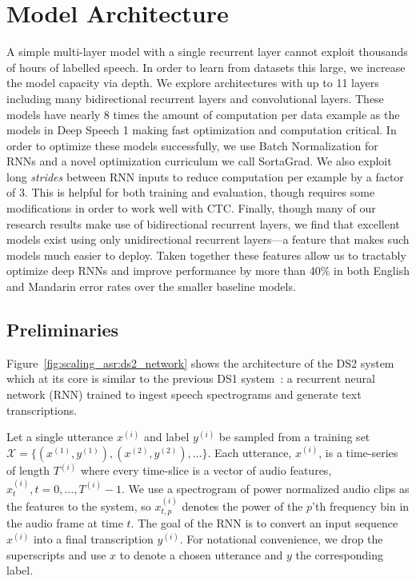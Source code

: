 \section{Model Architecture}
\label{sec:scale_asr:model}

A simple multi-layer model with a single recurrent layer cannot exploit
thousands of hours of labelled speech. In order to learn from datasets this
large, we increase the model capacity via depth. We explore architectures with
up to 11 layers including many bidirectional recurrent layers and convolutional
layers. These models have nearly 8 times the amount of computation per data
example as the models in Deep Speech 1 making fast optimization and computation
critical. In order to optimize these models successfully, we use Batch
Normalization for RNNs and a novel optimization curriculum we call SortaGrad.
We also exploit long \emph{strides} between RNN inputs to reduce computation
per example by a factor of 3. This is helpful for both training and evaluation,
though requires some modifications in order to work well with CTC. Finally,
though many of our research results make use of bidirectional recurrent layers,
we find that excellent models exist using only unidirectional recurrent
layers---a feature that makes such models much easier to deploy.  Taken
together these features allow us to tractably optimize deep RNNs and improve
performance by more than 40\% in both English and Mandarin error rates over the
smaller baseline models.

\subsection{Preliminaries}

Figure~\ref{fig:scaling_asr:ds2_network} shows the architecture of the DS2
system which at its core is similar to the previous DS1
system~\cite{hannun2014deepspeech}: a recurrent neural network (RNN) trained to
ingest speech spectrograms and generate text transcriptions. 

Let a single utterance $x^{(i)}$ and label $y^{(i)}$ be sampled from a training
set $\mathcal{X} = \{(x^{(1)},y^{(1)}),(x^{(2)},y^{(2)}),\ldots\}$. Each
utterance, $x^{(i)}$, is a time-series of length $T^{(i)}$ where every
time-slice is a vector of audio features, $x_t^{(i)},  t=0,\ldots,T^{(i)}-1$.
We use a spectrogram of power normalized audio clips as the features to the
system, so $x^{(i)}_{t,p}$ denotes the power of the $p$'th frequency bin in the
audio frame at time $t$. The goal of the RNN is to convert an input sequence
$x^{(i)}$ into a final transcription $y^{(i)}$. For notational convenience, we
drop the superscripts and use $x$ to denote a chosen utterance and $y$ the
corresponding label.

